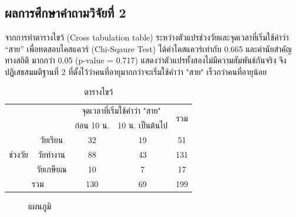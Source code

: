 \documentclass[a4paper]{article}
\begin{document}
\subsection{ผลการศึกษาคำถามวิจัยที่ 2}
    จากการทำตารางไขว้ (Cross tabulation table) ระหว่างตัวแปรช่วงวัยและจุดเวลาที่เริ่มใช้คำว่า “สาย” เพื่อทดสอบไคสแควร์ (Chi-Sqaure Test) ได้ค่าไคสแควร์เท่ากับ 0.665 และค่านัยสำคัญทางสถิติ มากกว่า 0.05 (p-value = 0.717)  แสดงว่าตัวแปรทั้งสองไม่มีความสัมพันธ์กันจริง จึงปฏิเสธสมมติฐานที่ 2 ที่ตั้งไว้ว่าคนที่อายุมากกว่าจะเริ่มใช้คำว่า "สาย" เร็วกว่าคนที่อายุน้อย
    \begin{table}[!ht]
        \begin{center}
        \begin{tabular}{|c|c|c|c|c|}
            \cline{3-5}
            \multicolumn{2}{c|}{} & \multicolumn{2}{c|}{จุดเวลาที่เริ่มใช้คำว่า "สาย"} & \multirow{2}{*}{รวม} \\
            \cline{3-4}
            \multicolumn{2}{c|}{} & ก่อน 10 น. & 10 น. เป็นต้นไป & \\
            \hline
            \multirow{3}{*}{ช่วงวัย} & วัยเรียน & 32 & 19 & 51 \\
            \cline{2-5}
            & วัยทำงาน & 88 & 43 & 131 \\
            \cline{2-5}
            & วัยเกษียณ & 10 & 7 & 17 \\
            \hline
            \multicolumn{2}{|c|}{รวม} & 130 & 69 & 199 \\
            \hline
        \end{tabular}
        \end{center}
        \caption{ตารางไขว้}
    \end{table}
    \begin{figure}[!ht]
        \begin{center}
        \end{center}
        \caption{แผนภูมิ}
    \end{figure}
\end{document}
